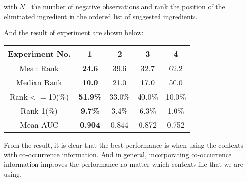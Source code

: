 \documentclass[12pt]{report}
\begin{document}
\begin{multicols}{2}
with $N^-$ the number of negative observations and rank the position of the eliminated ingredient in the ordered list of suggested ingredients.

And the result of experiment are shown below:

 
\begin{tabular}{|c|c|c|c|c|}
\hline
Experiment No. & 1 & 2 & 3 & 4 \\ \hline
Mean Rank & \textbf{24.6} & 39.6 & 32.7 & 62.2 \\ \hline
Median Rank & \textbf{10.0} & 21.0 & 17.0 & 50.0 \\ \hline
Rank$<=$10(\%) & \textbf{51.9\%} & 33.0\% & 40.0\% & 10.0\% \\ \hline
Rank 1(\%) & \textbf{9.7\%}  & 3.4\% & 6.3\% & 1.0\% \\ \hline
Mean AUC & \textbf{0.904} & 0.844 & 0.872 & 0.752 \\ \hline

\end{tabular}


From the result, it is clear that the best performance is when using the contexts with co-occurrence information. And in general, incorporating co-occurrence information improves the performance no matter which contexts file that we are using. 

\end{multicols}
\end{document}
